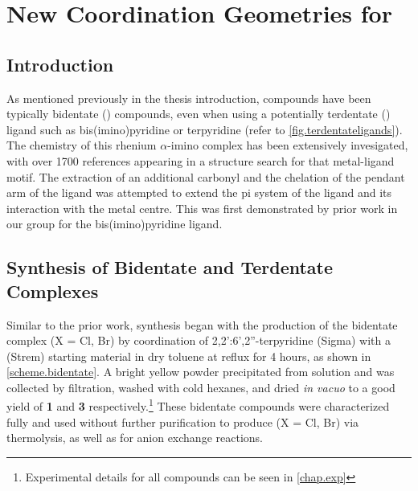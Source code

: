 \chapter{New Coordination Geometries for \texorpdfstring{}{Rhenium (I)}} \label{chap.newchem}
\section{Introduction}

As mentioned previously in the thesis introduction,  compounds have been typically bidentate () compounds, even when using a potentially terdentate () ligand such as bis(imino)pyridine or terpyridine (refer to \autoref{fig.terdentateligands}). The chemistry of this rhenium $\alpha$-imino complex has been extensively invesigated, with over 1700 references appearing in a structure search for that metal-ligand motif. The extraction of an additional carbonyl and the chelation of the pendant arm of the ligand was attempted to extend the pi system of the ligand and its interaction with the metal centre. This was first demonstrated by prior work in our group for the bis(imino)pyridine ligand\autocite{jurca2013}. 

\section{Synthesis of Bidentate and Terdentate \texorpdfstring{}{Rhenium (I)} Complexes}

Similar to the prior work, synthesis began with the production of the bidentate complex  (X = Cl, Br) by coordination of 2,2':6',2''-terpyridine (Sigma) with a  (Strem) starting material in dry toluene at reflux for 4 hours, as shown in \autoref{scheme.bidentate}. A bright yellow powder precipitated from solution and was collected by filtration, washed with cold hexanes, and dried \textit{in vacuo} to a good yield of \textbf{1} and \textbf{3} respectively.\footnote{Experimental details for all compounds can be seen in \autoref{chap.exp} } These bidentate compounds were characterized fully and used without further purification to produce  (X = Cl, Br) via thermolysis, as well as for anion exchange reactions. 

